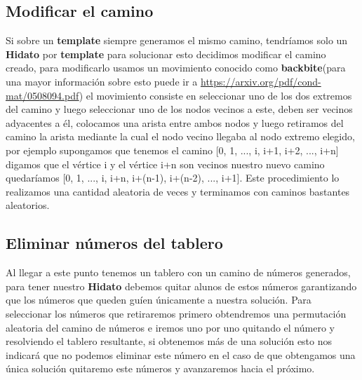 \documentclass[12pt]{article}
\begin{document}
\subsection{Modificar el camino}
Si sobre un {\bf template} siempre generamos el mismo camino, tendr\'iamos solo un {\bf Hidato} por {\bf template} para solucionar esto decidimos modificar el camino creado, para modificarlo usamos un movimiento conocido como {\bf backbite}(para una mayor informaci\'on sobre esto puede ir a   \url{https://arxiv.org/pdf/cond-mat/0508094.pdf}) el movimiento consiste
en seleccionar uno de los dos extremos del camino y luego seleccionar uno de los nodos vecinos a este, deben ser vecinos adyacentes a \'el, colocamos una arista entre ambos nodos y luego retiramos del camino la arista mediante la cual el nodo vecino llegaba al nodo extremo elegido,
por ejemplo supongamos que tenemos el camino [0, 1, ..., i, i+1, i+2, ..., i+n] digamos que el v\'ertice i y el v\'ertice i+n son vecinos nuestro nuevo camino quedar\'iamos
[0, 1, ..., i, i+n, i+(n-1), i+(n-2), ..., i+1]. Este procedimiento lo realizamos una cantidad aleatoria de veces y terminamos con caminos bastantes aleatorios.
\subsection{Eliminar n\'umeros del tablero}
Al llegar a este punto tenemos un tablero con un camino de n\'umeros generados, para tener nuestro {\bf Hidato} debemos quitar alunos de estos n\'umeros garantizando que los n\'umeros que queden gu\'ien \'unicamente a nuestra soluci\'on.
Para seleccionar los n\'umeros que retiraremos primero obtendremos una permutaci\'on aleatoria del camino de n\'umeros e iremos uno por uno quitando el n\'umero y resolviendo el tablero resultante, si obtenemos m\'as de una soluci\'on esto nos indicar\'a que no podemos eliminar este n\'umero en el caso de que obtengamos una \'unica
soluci\'on quitaremo este n\'umeros y avanzaremos hacia el pr\'oximo.
\end{document}
